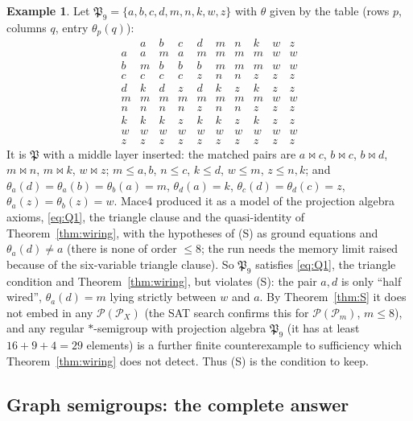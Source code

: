 \documentclass[11pt]{amsart}
\theoremstyle{definition}
\newtheorem{example}[theorem]{Example}
\renewcommand{\P}{\mathcal{P}}
\newcommand{\mt}{\bowtie}   %
\begin{document}
\begin{example}\label{ex:P9}
Let $\mathfrak P_9=\{a,b,c,d,m,n,k,w,z\}$ with $\theta$ given by the table (rows $p$, columns $q$, entry $\theta_p(q)$):
\[
\begin{array}{c|ccccccccc}
 & a & b & c & d & m & n & k & w & z\\ \hline
a & a & m & a & m & m & m & m & w & w\\
b & m & b & b & b & m & m & m & w & w\\
c & c & c & c & z & n & n & z & z & z\\
d & k & d & z & d & k & z & k & z & z\\
m & m & m & m & m & m & m & m & w & w\\
n & n & n & n & z & n & n & z & z & z\\
k & k & k & z & k & k & z & k & z & z\\
w & w & w & w & w & w & w & w & w & w\\
z & z & z & z & z & z & z & z & z & z
\end{array}
\]
It is $\mathfrak P$ with a middle layer inserted: the matched pairs are $a\mt c$, $b\mt c$, $b\mt d$, $m\mt n$, $m\mt k$, $w\mt z$; $m\le a,b$, $n\le c$, $k\le d$, $w\le m$, $z\le n,k$; and $\theta_a(d)=\theta_a(b)=\theta_b(a)=m$, $\theta_d(a)=k$, $\theta_c(d)=\theta_d(c)=z$, $\theta_a(z)=\theta_b(z)=w$. Mace4 produced it as a model of the projection algebra axioms, \eqref{eq:Q1}, the triangle clause and the quasi-identity of Theorem~\ref{thm:wiring}, with the hypotheses of (S) as ground equations and $\theta_a(d)\ne a$ (there is none of order $\le8$; the run needs the memory limit raised because of the six-variable triangle clause). So $\mathfrak P_9$ satisfies \eqref{eq:Q1}, the triangle condition and Theorem~\ref{thm:wiring}, but violates (S): the pair $a,d$ is only ``half wired'', $\theta_a(d)=m$ lying strictly between $w$ and $a$. By Theorem~\ref{thm:S} it does not embed in any $\P(\P_X)$ (the SAT search confirms this for $\P(\P_m)$, $m\le8$), and any regular $*$-semigroup with projection algebra $\mathfrak P_9$ (it has at least $16+9+4=29$ elements) is a further finite counterexample to sufficiency which Theorem~\ref{thm:wiring} does not detect. Thus (S) is the condition to keep.
\end{example}

\subsection{Graph semigroups: the complete answer}\label{subsec:graphthm}
\end{document}
